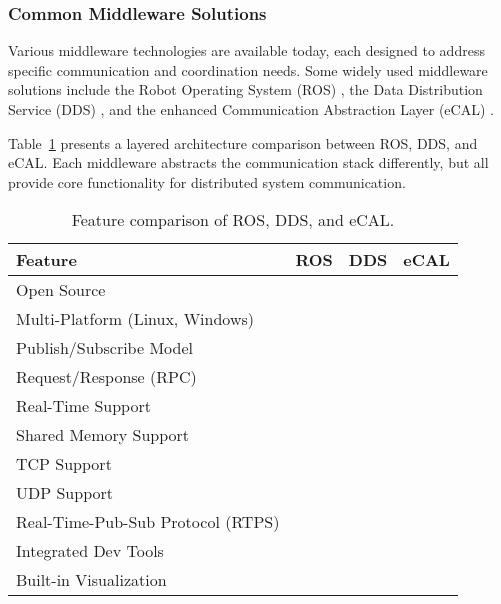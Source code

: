 \newpage
\subsubsection{Common Middleware Solutions}

Various middleware technologies are available today, each designed to address specific communication and coordination needs. Some widely used middleware solutions include the Robot Operating System (ROS) \cite{quigley2009}, the Data Distribution Service (DDS) \cite{pardo2003}, and the enhanced Communication Abstraction Layer (eCAL) \cite{ecal_official_docs}.

\vspace{1em}
Table~\ref{tab:middleware_comparison} presents a layered architecture comparison between ROS, DDS, and eCAL. Each middleware abstracts the communication stack differently, but all provide core functionality for distributed system communication.

\begin{table}[H]
	\centering
	\renewcommand{\arraystretch}{1.3}
	\begin{tabular}{|p{7cm}|c|c|c|}
		\hline
		\textbf{Feature} & \textbf{ROS} & \textbf{DDS} & \textbf{eCAL} \\
		\hline
		Open Source & \cmark & \xmark & \cmark \\
		\hline
		Multi-Platform (Linux, Windows) & \cmark & \cmark & \cmark \\
		\hline
		Publish/Subscribe Model & \cmark & \cmark & \cmark \\
		\hline
		Request/Response (RPC) & \cmark & \cmark & \cmark \\
		\hline
		Real-Time Support & \xmark & \cmark & \xmark \\
		\hline
		Shared Memory Support & \xmark & \xmark & \cmark \\
		\hline
		TCP Support & \cmark & \cmark & \cmark \\
		\hline
		UDP Support & \cmark & \cmark & \cmark \\
		\hline
		Real-Time-Pub-Sub Protocol (RTPS) & \xmark & \cmark & \xmark \\
		\hline
		Integrated Dev Tools & \cmark & \xmark & \xmark \\
		\hline
		Built-in Visualization & \cmark & \xmark & \xmark \\
		\hline
	\end{tabular}
	\caption{Feature comparison of ROS, DDS, and eCAL.}
	\label{tab:middleware_comparison}
\end{table}

